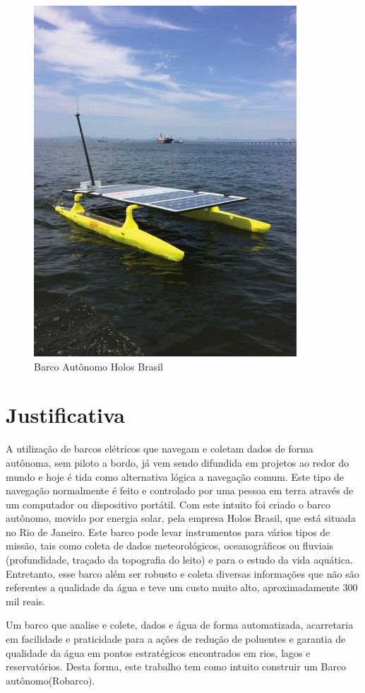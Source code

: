  \begin{figure} [!htp]
	\centering
	\includegraphics[scale=0.5]{figuras/barcoINTRODUCAO}
	\caption{Barco Autônomo Holos Brasil}
	\label{barcoINTRODUCAO}
\end{figure}
\section{Justificativa}

A  utilização de barcos elétricos que navegam e coletam dados de forma autônoma, sem piloto a bordo, já vem sendo difundida em projetos ao redor do mundo e hoje é tida como alternativa lógica a navegação comum. Este tipo de navegação normalmente é feito e controlado por uma pessoa em terra através de um computador ou dispositivo portátil. Com este intuito foi criado o barco autônomo, movido por energia solar, pela empresa Holos Brasil, que está situada no Rio de Janeiro. 
Este barco pode levar instrumentos para vários tipos de missão, tais como coleta de dados meteorológicos, oceanográficos ou fluviais (profundidade, traçado da topografia do leito) e para o estudo da vida aquática. 
Entretanto, esse barco além ser robusto e coleta diversas informações que não são referentes a qualidade da água e teve um custo muito alto, aproximadamente 300 mil reais.

Um barco que analise e colete, dados e água de forma automatizada, acarretaria em facilidade e praticidade para a ações de redução de poluentes e garantia de qualidade da água em pontos estratégicos encontrados em rios, lagos e reservatórios. Desta forma, este trabalho tem como intuito construir um Barco autônomo(Robarco).

